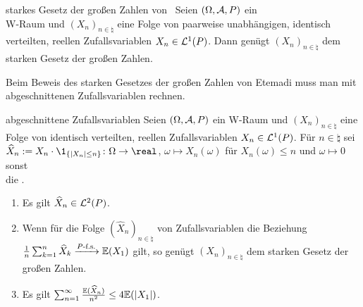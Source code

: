 \begin{Satz}{starkes Gesetz der großen Zahlen von \upshape\,\!}
    Seien $(\Omega, \mathcal{A}, P)$ ein\\
    W-Raum und $(X_n)_{n \in \natural}$
    eine Folge von paarweise unabhängigen, identisch verteilten, reellen Zufallsvariablen
    $X_n \in \mathcal{L}^1(P)$.
    Dann genügt $(X_n)_{n \in \natural}$ dem starken Gesetz der großen Zahlen.
\end{Satz}

\linie
\pagebreak

\begin{Bem}
    Beim Beweis des starken Gesetzes der großen Zahlen von Etemadi muss man mit
    abgeschnittenen Zufallsvariablen rechnen.
\end{Bem}

\begin{Lemma}{abgeschnittene Zufallsvariablen}
    Seien $(\Omega, \mathcal{A}, P)$ ein W-Raum und $(X_n)_{n \in \natural}$
    eine Folge von identisch verteilten, reellen Zufallsvariablen $X_n \in \mathcal{L}^1(P)$.
    Für $n \in \natural$ sei\\
    $\widehat{X}_n := X_n \cdot \1_{\{|X_n| \le n\}}\colon \Omega \rightarrow \real$,
    $\omega \mapsto X_n(\omega)$ für $X_n(\omega) \le n$ und $\omega \mapsto 0$ sonst\\
    die .
    \begin{enumerate}
        \item
        Es gilt $\widehat{X}_n \in \mathcal{L}^2(P)$.

        \item
        Wenn für die Folge $(\widehat{X}_n)_{n \in \natural}$ von Zufallsvariablen
        die Beziehung $\frac{1}{n} \sum_{k=1}^n \widehat{X}_k \xrightarrow{P\text{-f.s.}} \mathbb{E}(X_1)$
        gilt, so genügt $(X_n)_{n \in \natural}$ dem starken Gesetz der großen Zahlen.

        \item
        Es gilt $\sum_{n=1}^\infty \frac{\mathbb{E}(\widehat{X}_n)}{n^2} \le 4 \mathbb{E}(|X_1|)$.
    \end{enumerate}
\end{Lemma}

\linie

